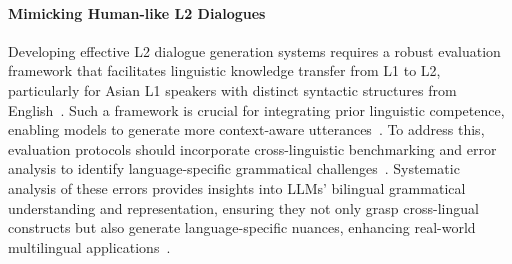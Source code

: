 \paragraph{Mimicking Human-like L2 Dialogues} 
Developing effective L2 dialogue generation systems requires a robust evaluation framework that facilitates linguistic knowledge transfer from L1 to L2, particularly for Asian L1 speakers with distinct syntactic structures from English~\cite{li-qiu-2023-finding}. Such a framework is crucial for integrating prior linguistic competence, enabling models to generate more context-aware utterances~\cite{sung-etal-2024-context,gao2024cnima}. To address this, evaluation protocols should incorporate cross-linguistic benchmarking and error analysis to identify language-specific grammatical challenges~\cite{kobayashi-etal-2024-large}. Systematic analysis of these errors provides insights into LLMs’ bilingual grammatical understanding and representation, ensuring they not only grasp cross-lingual constructs but also generate language-specific nuances, enhancing real-world multilingual applications~\cite{cong2025demystifying,gao2024interaction,singh2024three,poole2024llm}.

